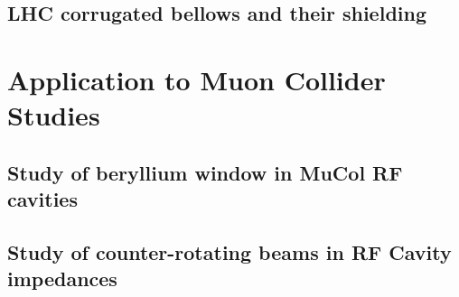 



\subsection{LHC corrugated bellows and their shielding}




\section{Application to Muon Collider Studies}


\subsection{Study of beryllium window in MuCol RF cavities}

\subsection{Study of counter-rotating beams in RF Cavity impedances}
